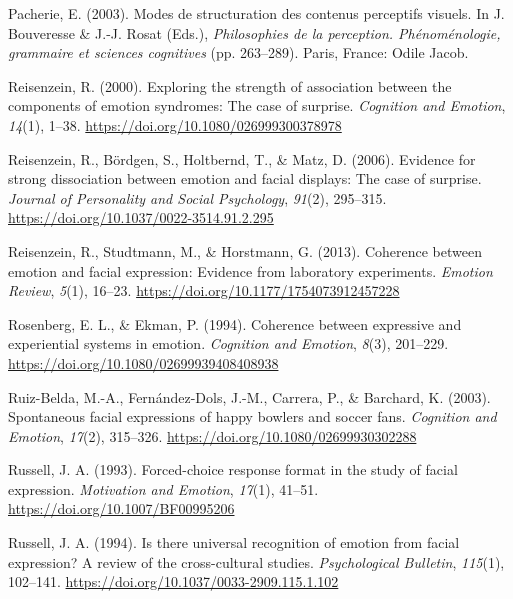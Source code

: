 \documentclass[
  english,
  doc]{apa7}
\newlength{\cslhangindent}
\newenvironment{cslreferences}%
  {\setlength{\parindent}{0pt}%
  \everypar{\setlength{\hangindent}{\cslhangindent}}\ignorespaces}%
  {\par}
\begin{document}
\begin{cslreferences}
\leavevmode\hypertarget{ref-pacherie2003modes}{}%
Pacherie, E. (2003). Modes de structuration des contenus perceptifs visuels. In J. Bouveresse \& J.-J. Rosat (Eds.), \emph{Philosophies de la perception. Phénoménologie, grammaire et sciences cognitives} (pp. 263--289). Paris, France: Odile Jacob.

\leavevmode\hypertarget{ref-reisenzein2000exploring}{}%
Reisenzein, R. (2000). Exploring the strength of association between the components of emotion syndromes: The case of surprise. \emph{Cognition and Emotion}, \emph{14}(1), 1--38. \url{https://doi.org/10.1080/026999300378978}

\leavevmode\hypertarget{ref-reisenzein2006evidence}{}%
Reisenzein, R., Bördgen, S., Holtbernd, T., \& Matz, D. (2006). Evidence for strong dissociation between emotion and facial displays: The case of surprise. \emph{Journal of Personality and Social Psychology}, \emph{91}(2), 295--315. \url{https://doi.org/10.1037/0022-3514.91.2.295}

\leavevmode\hypertarget{ref-reisenzein2013coherence}{}%
Reisenzein, R., Studtmann, M., \& Horstmann, G. (2013). Coherence between emotion and facial expression: Evidence from laboratory experiments. \emph{Emotion Review}, \emph{5}(1), 16--23. \url{https://doi.org/10.1177/1754073912457228}

\leavevmode\hypertarget{ref-rosenberg1994coherence}{}%
Rosenberg, E. L., \& Ekman, P. (1994). Coherence between expressive and experiential systems in emotion. \emph{Cognition and Emotion}, \emph{8}(3), 201--229. \url{https://doi.org/10.1080/02699939408408938}

\leavevmode\hypertarget{ref-ruiz2003spontaneous}{}%
Ruiz-Belda, M.-A., Fernández-Dols, J.-M., Carrera, P., \& Barchard, K. (2003). Spontaneous facial expressions of happy bowlers and soccer fans. \emph{Cognition and Emotion}, \emph{17}(2), 315--326. \url{https://doi.org/10.1080/02699930302288}

\leavevmode\hypertarget{ref-russell1993forced}{}%
Russell, J. A. (1993). Forced-choice response format in the study of facial expression. \emph{Motivation and Emotion}, \emph{17}(1), 41--51. \url{https://doi.org/10.1007/BF00995206}

\leavevmode\hypertarget{ref-russell1994there}{}%
Russell, J. A. (1994). Is there universal recognition of emotion from facial expression? A review of the cross-cultural studies. \emph{Psychological Bulletin}, \emph{115}(1), 102--141. \url{https://doi.org/10.1037/0033-2909.115.1.102}


\end{cslreferences}
\end{document}
